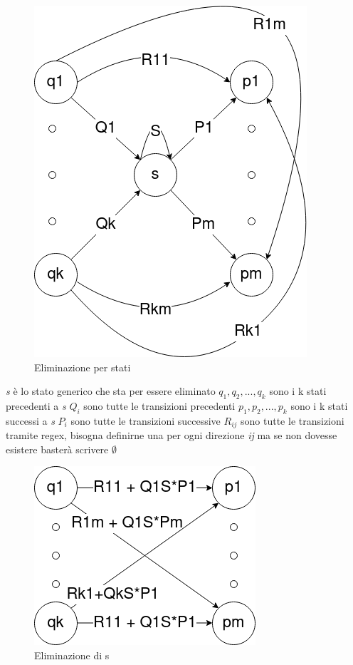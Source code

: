 \documentclass[12pt]{article}
\begin{document}
	\newpage

	\begin{figure}[ht]
		\includegraphics[scale = 0.5]{media/regex_dfa.png}
		\centering
		\caption{Eliminazione per stati}
	\end{figure}

	\begin{outline}
		\1 \emph{s} è lo stato generico che sta per essere eliminato
		\1 $q_1, q_2,...,q_k$ sono i k stati precedenti a \emph{s}
		\1 $Q_i$ sono tutte le transizioni precedenti
		\1 $p_1, p_2,...,p_k$ sono i k stati successi a \emph{s}
		\1 $P_i$ sono tutte le transizioni successive
		\1 $R_{ij}$ sono tutte le transizioni tramite regex, bisogna definirne una per ogni direzione \emph{ij} ma se non dovesse esistere basterà scrivere $\emptyset$
	\end{outline}

	\begin{figure}[ht]
		\includegraphics[scale = 0.5]{media/removed_s.png}
		\centering
		\caption{Eliminazione di s}
	\end{figure}
\end{document}

